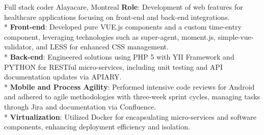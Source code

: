 \documentclass[
  a4paper,
   maincolor=cvblue,
   sectioncolor=cvblue,
]{fortysecondscv}
\begin{document}
\newpage
\makebacksidebar



\begin{cvtable}
    {Full stack coder}
    {Alayacare, Montreal}
    {
      \textbf{Role}: Development of web features for healthcare applications focusing on front-end and back-end integrations.\\
      * \textbf{Front-end}: Developed pure VUE.js components and a custom time-entry component, leveraging technologies such as super-agent, moment.js, simple-vue-validator, and LESS for enhanced CSS management. \\
      * \textbf{Back-end}: Engineered solutions using PHP 5 with YII Framework and PYTHON for RESTful micro-services, including unit testing and API documentation updates via APIARY. \\
      * \textbf{Mobile and Process Agility}: Performed intensive code reviews for Android and adhered to agile methodologies with three-week sprint cycles, managing tasks through Jira and documentation via Confluence.\\
      * \textbf{Virtualization}: Utilized Docker for encapsulating micro-services and software components, enhancing deployment efficiency and isolation.\\
    }
\end{cvtable}
\end{document}
